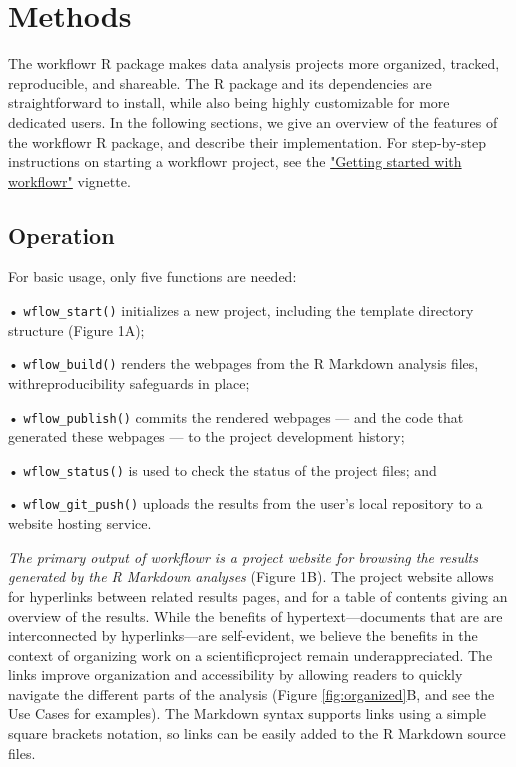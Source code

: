 \documentclass[9pt,a4paper]{extarticle}
\begin{document}
\section*{Methods}

The workflowr R package makes data analysis projects more organized,
tracked, reproducible, and shareable. The R package and its dependencies
are straightforward to install, while also being highly customizable for
more dedicated users. In the following sections, we give an overview of
the features of the workflowr R package, and describe their
implementation. For step-by-step instructions on starting a workflowr
project, see the
\href{https://jdblischak.github.io/workflowr/articles/wflow-01-getting-started.html}{"Getting
started with workflowr"} vignette.

\subsection*{Operation}

For basic usage, only five functions are needed:

• \verb|wflow_start()| initializes a new project, including the template
directory structure (Figure 1A);

• \verb|wflow_build()| renders the webpages from the R Markdown analysis files,
withreproducibility safeguards in place;

• \verb|wflow_publish()| commits the rendered webpages --- and the code that
generated these webpages --- to the project development history;

• \verb|wflow_status()| is used to check the status of the project files; and

• \verb|wflow_git_push()| uploads the results from the user's local repository
to a website hosting service.

\textit{The primary output of workflowr is a project website for
browsing the results generated by the R Markdown analyses} (Figure 1B).
The project website allows for hyperlinks between related results pages,
and for a table of contents giving an overview of the results. While the
benefits of hypertext—documents that are are interconnected by
hyperlinks—are self-evident, we believe the benefits in the context of
organizing work on a scientificproject remain underappreciated. The
links improve organization and accessibility by allowing readers to
quickly navigate the different parts of the analysis (Figure \ref{fig:organized}B, and see
the Use Cases for examples). The Markdown syntax supports links using a
simple square brackets notation, so links can be easily added to the R
Markdown source files.
\end{document}
